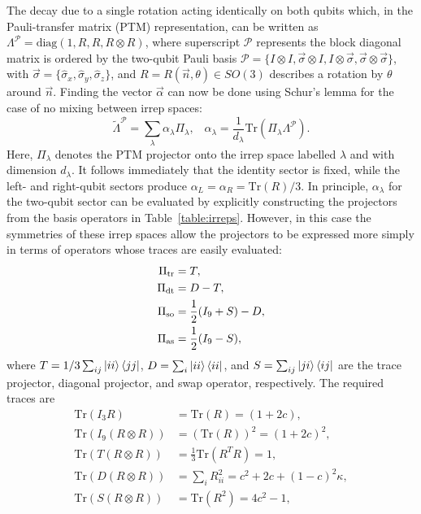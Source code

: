 The decay due to a single rotation acting identically on both qubits which, in the Pauli-transfer matrix (PTM) representation, can be written as $\Lambda^\mathcal{P}=\mathrm{diag}(1, R, R, R\otimes R)$, 
where superscript $\mathcal{P}$ represents the block diagonal matrix is ordered by the two-qubit Pauli basis $\mathcal{P}=\{I\otimes I, \vec\sigma\otimes I , I\otimes\vec\sigma, \vec\sigma\otimes\vec\sigma\}$, with $\vec\sigma = \{\hat\sigma_x, \hat\sigma_y, \hat\sigma_z\}$, and
$R=R(\vec{n}, \theta)\in SO(3)$ describes a rotation by $\theta$ around $\vec{n}$. Finding the vector $\vec\alpha$ can now be done using Schur's lemma for the case of no mixing between irrep spaces:
\begin{equation}\label{eqn:PTM projector decomposition}
    \tilde\Lambda^\mathcal{P}=\sum_\lambda\alpha_\lambda\Pi_\lambda,\hspace{10pt} \alpha_\lambda=\frac{1}{d_\lambda}\mathrm{Tr}(\Pi_\lambda\Lambda^{\mathcal{P}}).
\end{equation}
Here, $\Pi_\lambda$ denotes the PTM projector onto the irrep space labelled $\lambda$ and with dimension $d_\lambda$. It follows immediately that the identity sector is fixed, while the left- and right-qubit sectors produce $\alpha_L=\alpha_R=\mathrm{Tr}(R)/3$. In principle, $\alpha_\lambda$ for the two-qubit sector can be evaluated by explicitly constructing the projectors from the basis operators in Table~\ref{table:irreps}. However, in this case the symmetries of these irrep spaces allow the projectors to be expressed more simply in terms of operators whose traces are easily evaluated:
    \begin{subequations}
\label{eqn:irrep symmetry projector decomposition}
\begin{align}
    \Pi_{\rm tr}&=T,\\
    \Pi_{\rm dt}&=D-T,\\
    \Pi_{\rm so}&=\frac{1}{2}(I_9+S)-D,\\
    \Pi_{\rm as}&=\frac{1}{2}(I_9-S),
\end{align}
\end{subequations}
where $T=1/3\sum_{ij}\ket{ii}\bra{jj}$, $D=\sum_i\ket{ii}\bra{ii}$, and $S=\sum_{ij}\ket{ji}\bra{ij}$ are the trace projector, diagonal projector, and swap operator, respectively. The required traces are
    \begin{subequations}
\begin{align}
     \mathrm{Tr}(I_3 R)&=\mathrm{Tr}(R)=(1+2c),\\
     \mathrm{Tr}(I_9(R\otimes R))&=(\mathrm{Tr}(R))^2=(1+2c)^2,\\
    \mathrm{Tr}(T(R\otimes R))&=\frac{1}{3}\mathrm{Tr}(R^TR)=1,\\
    \mathrm{Tr}(D(R\otimes R))&=\sum_i R_{ii}^2=c^2+2c+(1-c)^2\kappa,\\
    \mathrm{Tr}(S(R\otimes R))&=\mathrm{Tr}(R^2)=4c^2-1,
\end{align}
\end{subequations}
